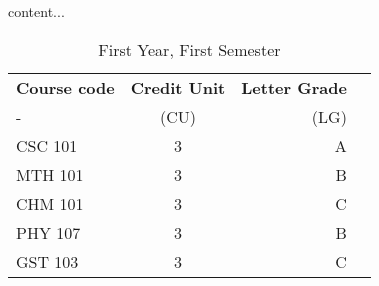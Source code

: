 \documentclass{article}
\begin{document}
\begin{table}[h!]
	content...

	\centering
	\caption{First Year, First Semester}
	\label{tab:table1}
	\begin{tabular}{l|c|r|c}
		\textbf{Course code} & \textbf{Credit Unit} & \textbf{Letter Grade}\\
			-&(CU)&(LG) \\
		\hline
		CSC 101 &3&A\\
		MTH 101 &3&B\\
		CHM 101 &3&C\\
		PHY 107 &3&B\\
		GST 103 &3&C\\
	\end{tabular}
\end{table}
\end{document}
